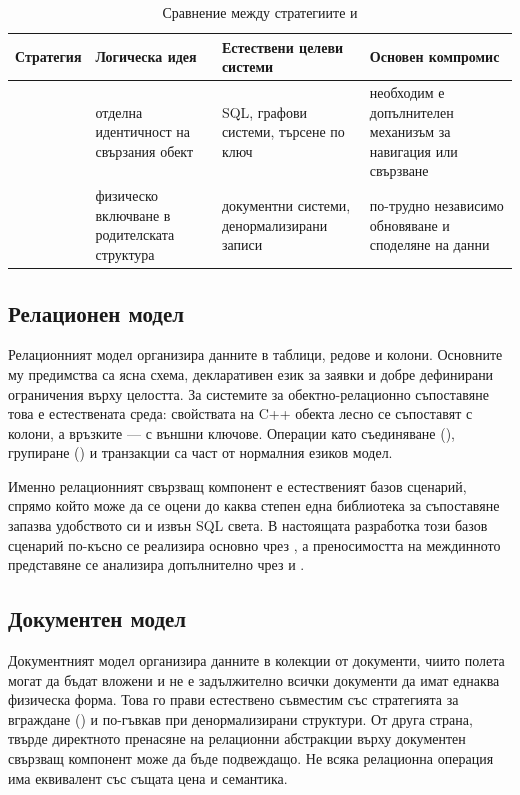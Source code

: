 \begin{table}[H]
\centering
\small
\caption{Сравнение между стратегиите  и }
\label{tab:relationship_strategies}
\begin{tabularx}{\textwidth}{L{2.8cm}L{3.2cm}L{3.0cm}Y}
\toprule
\textbf{Стратегия} & \textbf{Логическа идея} & \textbf{Естествени целеви системи} & \textbf{Основен компромис} \\
\midrule
{} & отделна идентичност на свързания обект & SQL, графови системи, търсене по ключ & необходим е допълнителен механизъм за навигация или свързване \\
 & физическо включване в родителската структура & документни системи, денормализирани записи & по-трудно независимо обновяване и споделяне на данни \\
\bottomrule
\end{tabularx}
\end{table}

\subsection{Релационен модел}

Релационният модел организира данните в таблици, редове и колони. Основните му предимства са ясна схема, декларативен език за заявки и добре дефинирани ограничения върху целостта. За системите за обектно-релационно съпоставяне това е естествената среда: свойствата на C++ обекта лесно се съпоставят с колони, а връзките --- с външни ключове. Операции като съединяване (), групиране () и транзакции са част от нормалния езиков модел.

Именно релационният свързващ компонент е естественият базов сценарий, спрямо който може да се оцени до каква степен една библиотека за съпоставяне запазва удобството си и извън SQL света. В настоящата разработка този базов сценарий по-късно се реализира основно чрез , а преносимостта на междинното представяне се анализира допълнително чрез  и .

\subsection{Документен модел}

Документният модел организира данните в колекции от документи, чиито полета могат да бъдат вложени и не е задължително всички документи да имат еднаква физическа форма. Това го прави естествено съвместим със стратегията за вграждане () и по-гъвкав при денормализирани структури. От друга страна, твърде директното пренасяне на релационни абстракции върху документен свързващ компонент може да бъде подвеждащо. Не всяка релационна операция има еквивалент със същата цена и семантика.


